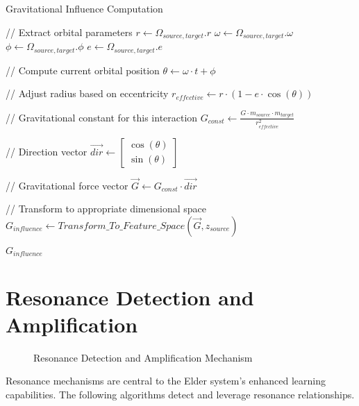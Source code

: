 \begin{algorithm}
\caption{Gravitational Influence Computation}
\begin{algorithmic}[1]
    \State // Extract orbital parameters
    \State $r \gets \Omega_{source,target}.r$ 
    \State $\omega \gets \Omega_{source,target}.\omega$ 
    \State $\phi \gets \Omega_{source,target}.\phi$ 
    \State $e \gets \Omega_{source,target}.e$ 
    
    \State // Compute current orbital position
    \State $\theta \gets \omega \cdot t + \phi$ 
    
    \State // Adjust radius based on eccentricity
    \State $r_{effective} \gets r \cdot (1 - e \cdot \cos(\theta))$
    
    \State // Gravitational constant for this interaction
    \State $G_{const} \gets \frac{G \cdot m_{source} \cdot m_{target}}{r_{effective}^2}$
    
    \State // Direction vector
    \State $\vec{dir} \gets \begin{bmatrix} \cos(\theta) \\ \sin(\theta) \end{bmatrix}$
    
    \State // Gravitational force vector
    \State $\vec{G} \gets G_{const} \cdot \vec{dir}$
    
    \State // Transform to appropriate dimensional space
    \State $G_{influence} \gets Transform\_To\_Feature\_Space(\vec{G}, z_{source})$
    
    \State \Return $G_{influence}$
\EndFunction
\end{algorithmic}
\end{algorithm}

\section{Resonance Detection and Amplification}

\begin{figure}[htbp]
\centering

\caption{Resonance Detection and Amplification Mechanism}
\label{fig:resonance_detection}
\end{figure}

Resonance mechanisms are central to the Elder system's enhanced learning capabilities. The following algorithms detect and leverage resonance relationships.

